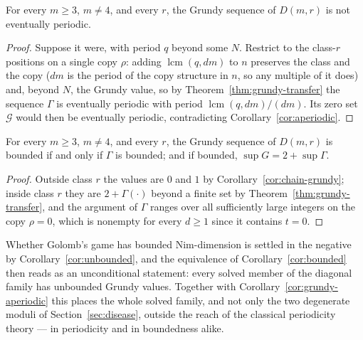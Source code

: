 \begin{corollary}\label{cor:grundy-aperiodic}
For every $m \ge 3$, $m \ne 4$, and every $r$, the Grundy sequence of
$D(m,r)$ is not eventually periodic.
\end{corollary}
\begin{proof}
Suppose it were, with period $q$ beyond some $N$. Restrict to the
class-$r$ positions on a single copy $\rho$: adding
$\operatorname{lcm}(q, dm)$ to $n$ preserves the class and the copy
($dm$ is the period of the copy structure in $n$, so any multiple of it
does) and, beyond $N$, the Grundy value, so by
Theorem~\ref{thm:grundy-transfer} the sequence $\Gamma$ is eventually
periodic with period $\operatorname{lcm}(q, dm)/(dm)$. Its zero set
$\mathcal{G}$ would then be eventually periodic, contradicting
Corollary~\ref{cor:aperiodic}.
\end{proof}

\begin{corollary}\label{cor:bounded}
For every $m \ge 3$, $m \ne 4$, and every $r$, the Grundy sequence of
$D(m,r)$ is bounded if and only if $\Gamma$ is bounded; and if bounded,
$\sup G = 2 + \sup \Gamma$.
\end{corollary}
\begin{proof}
Outside class $r$ the values are $0$ and $1$ by
Corollary~\ref{cor:chain-grundy}; inside class $r$ they are
$2 + \Gamma(\cdot)$ beyond a finite set by
Theorem~\ref{thm:grundy-transfer}, and the argument of $\Gamma$ ranges
over all sufficiently large integers on the copy $\rho = 0$, which is
nonempty for every $d \ge 1$ since it contains $t = 0$.
\end{proof}

Whether Golomb's game has bounded Nim-dimension is settled in the negative
by Corollary~\ref{cor:unbounded}, and the equivalence of
Corollary~\ref{cor:bounded} then reads as an unconditional statement:
every solved member of the diagonal family has unbounded Grundy values.
Together with Corollary~\ref{cor:grundy-aperiodic} this places the whole
solved family, and not only the two degenerate moduli of
Section~\ref{sec:disease}, outside the reach of the classical
periodicity theory --- in periodicity and in boundedness alike.

